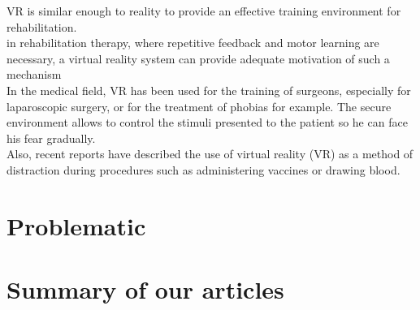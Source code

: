 \documentclass{article}
\begin{document}
VR is similar enough to reality to provide an effective training environment for rehabilitation. \\

in rehabilitation therapy, where repetitive feedback and motor learning are necessary, a virtual reality system can provide adequate motivation of such a mechanism \\
In the medical field, VR has been used for the training of surgeons, especially for laparoscopic surgery, or for the treatment of phobias for example. The secure environment allows to control the stimuli presented to the patient so he can face his fear gradually. \\
Also, recent reports have described the use of virtual reality (VR) as a method of distraction during
procedures such as administering vaccines or drawing blood. \\


\section{Problematic}


\section{Summary of our articles}
\end{document}
